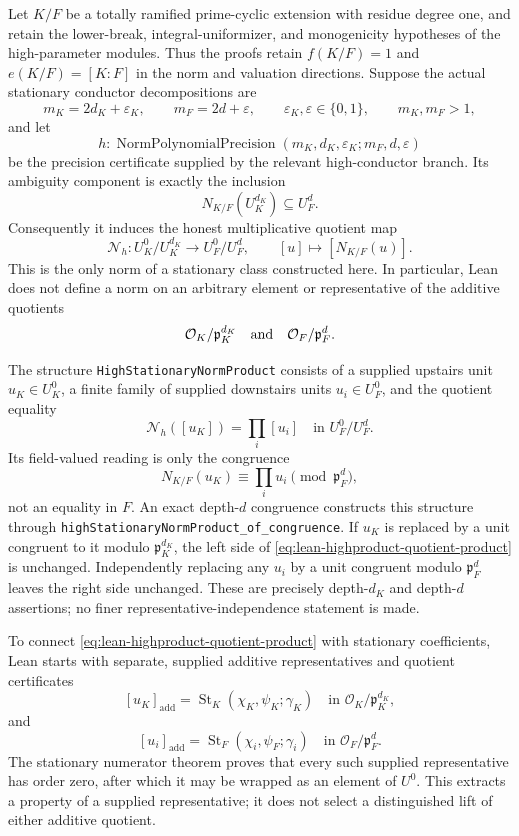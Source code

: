 \begin{theorem}
\label{mod:parameters-highproduct}
Let $K/F$ be a totally ramified prime-cyclic extension with residue degree
one, and retain the lower-break, integral-uniformizer, and monogenicity
hypotheses of the high-parameter modules.  Thus the proofs retain
$f(K/F)=1$ and $e(K/F)=[K:F]$ in the norm and valuation directions.
Suppose the actual stationary conductor decompositions are
\[
 m_K=2d_K+\varepsilon_K,
 \qquad m_F=2d+\varepsilon,
 \qquad \varepsilon_K,\varepsilon\in\{0,1\},
 \qquad m_K,m_F>1,
\]
and let
\[
 h:\operatorname{NormPolynomialPrecision}
   (m_K,d_K,\varepsilon_K;m_F,d,\varepsilon)
\]
be the precision certificate supplied by the relevant high-conductor
branch.  Its ambiguity component is exactly the inclusion
\[
 N_{K/F}(U_K^{d_K})\subseteq U_F^d.
\]
Consequently it induces the honest multiplicative quotient map
\begin{equation}
\label{eq:lean-highproduct-unit-norm}
 \mathcal N_h:U_K^0/U_K^{d_K}\longrightarrow U_F^0/U_F^d,
 \qquad [u]\longmapsto[N_{K/F}(u)].
\end{equation}
This is the only norm of a stationary class constructed here.  In
particular, Lean does not define a norm on an arbitrary element or
representative of the additive quotients
\[
 \mathcal O_K/\mathfrak p_K^{d_K}
 \quad\hbox{and}\quad
 \mathcal O_F/\mathfrak p_F^d.
\]

The structure \texttt{HighStationaryNormProduct} consists of a supplied
upstairs unit $u_K\in U_K^0$, a finite family of supplied downstairs units
$u_i\in U_F^0$, and the quotient equality
\begin{equation}
\label{eq:lean-highproduct-quotient-product}
 \boxed{\quad
   \mathcal N_h([u_K])=\prod_i[u_i]
   \quad\text{in }U_F^0/U_F^d.
 \quad}
\end{equation}
Its field-valued reading is only the congruence
\[
 N_{K/F}(u_K)\equiv\prod_i u_i\pmod{\mathfrak p_F^d},
\]
not an equality in $F$.  An exact depth-$d$ congruence constructs this
structure through \texttt{highStationaryNormProduct\_of\_congruence}.
If $u_K$ is replaced by a unit congruent to it modulo
$\mathfrak p_K^{d_K}$, the left side of
\eqref{eq:lean-highproduct-quotient-product} is unchanged.
Independently replacing any $u_i$ by a unit congruent modulo
$\mathfrak p_F^d$ leaves the right side unchanged.  These are precisely
depth-$d_K$ and depth-$d$ assertions; no finer representative-independence
statement is made.

To connect \eqref{eq:lean-highproduct-quotient-product} with stationary
coefficients, Lean starts with
separate, supplied additive representatives and quotient certificates
\[
 [u_K]_{\mathrm{add}}
  =\operatorname{St}_{K}(\chi_K,\psi_K;\gamma_K)
   \quad\text{in }\mathcal O_K/\mathfrak p_K^{d_K},
\]
and
\[
 [u_i]_{\mathrm{add}}
  =\operatorname{St}_{F}(\chi_i,\psi_F;\gamma_i)
   \quad\text{in }\mathcal O_F/\mathfrak p_F^d.
\]
The stationary numerator theorem proves that every such supplied
representative has order zero, after which it may be wrapped as an element
of $U^0$.  This extracts a property of a supplied representative; it does
not select a distinguished lift of either additive quotient.


\end{theorem}
